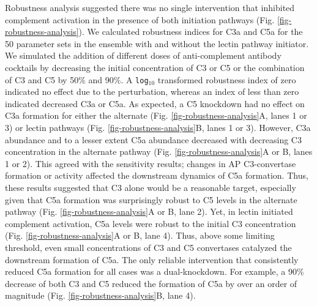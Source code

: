 \documentclass[12pt]{article}
\begin{document}
Robustness analysis suggested there was no single intervention that inhibited complement activation in the presence of both initiation pathways (Fig. \ref{fig-robustness-analysis}).
We calculated robustness indices for C3a and C5a for the 50 parameter sets in the ensemble with and without the lectin pathway initiator.
We simulated the addition of different doses of anti-complement antibody cocktails by decreasing the initial concentration of C3 or C5 or the combination of C3 and C5 by 50\% and 90\%.
A \texttt{log$_{10}$} transformed robustness index of zero indicated no effect due to the perturbation, whereas an index of less than zero indicated decreased C3a or C5a.
As expected, a C5 knockdown had no effect on C3a formation for either the alternate (Fig. \ref{fig-robustness-analysis}A, lanes 1 or 3) or lectin pathways
(Fig. \ref{fig-robustness-analysis}B, lanes 1 or 3).
However, C3a abundance and to a lesser extent C5a abundance decreased with decreasing C3 concentration in the alternate pathway (Fig. \ref{fig-robustness-analysis}A or B, lanes 1 or 2).
This agreed with the sensitivity results; changes in AP C3-convertase formation or activity affected the downstream dynamics of C5a formation.
Thus, these results suggested that C3 alone would be a reasonable target, especially given that C5a formation was surprisingly robust to C5 levels in the alternate pathway (Fig. \ref{fig-robustness-analysis}A or B, lane 2).
Yet, in lectin initiated complement activation, C5a levels were robust to the initial C3 concentration (Fig. \ref{fig-robustness-analysis}A or B, lane 4).
Thus, above some limiting threshold, even small concentrations of C3 and C5 convertases catalyzed the downstream formation of C5a.
The only reliable intervention that consistently reduced C5a formation for all cases was a dual-knockdown.
For example, a 90\% decrease of both C3 and C5 reduced the formation of C5a by over an order of magnitude (Fig. \ref{fig-robustness-analysis}B, lane 4).


\end{document}
